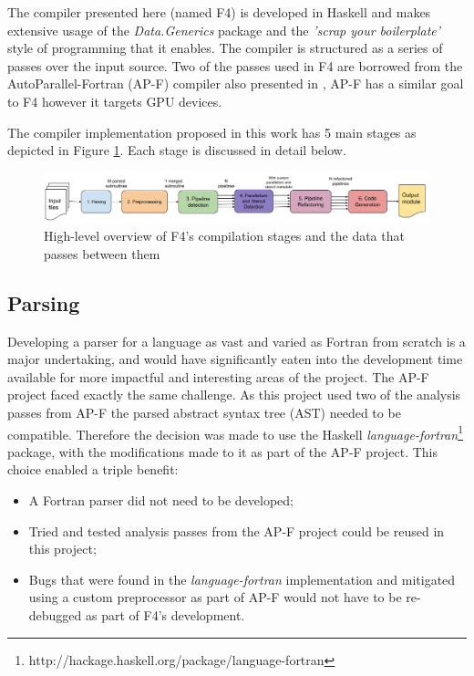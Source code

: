 \documentclass{mpaper}
\begin{document}
The compiler presented here (named F4) is developed in Haskell and makes extensive usage of the \textit{Data.Generics} package and the \textit{'scrap your boilerplate'} style of programming that it enables. The compiler is structured as a series of passes over the input source. Two of the passes used in F4 are borrowed from the AutoParallel-Fortran (AP-F) compiler also presented in \cite{VanderbauwhedeDavidson2018}, AP-F has a similar goal to F4 however it targets GPU devices.  

The compiler implementation proposed in this work has 5 main stages as depicted in Figure \ref{compilation_flow}.
Each stage is discussed in detail below. 

\begin{figure}
\begin{center}
\includegraphics[scale=0.45]{images/Compilation_flow.png}
\end{center}
\caption{\label{compilation_flow}High-level overview of F4's compilation stages and the data that passes between them}
\end{figure}

\subsection{Parsing}
\label{parsing}

Developing a parser for a language as vast and varied as Fortran from scratch is a major undertaking, and would have significantly eaten into the development time available for more impactful and interesting areas of the project.
The AP-F project faced exactly the same challenge.
As this project used two of the analysis passes from AP-F the parsed abstract syntax tree (AST) needed to be compatible.
Therefore the decision was made to use the Haskell \textit{language-fortran}\footnote{http://hackage.haskell.org/package/language-fortran} package, with the modifications made to it as part of the AP-F project.
This choice enabled a triple benefit: 
\begin{itemize}
    \item A Fortran parser did not need to be developed;
    \item Tried and tested analysis passes from the AP-F project could be reused in this project;
    \item Bugs that were found in the \textit{language-fortran} implementation and mitigated using a custom preprocessor as part of AP-F would not have to be re-debugged as part of F4's development.  
\end{itemize}
\end{document}
